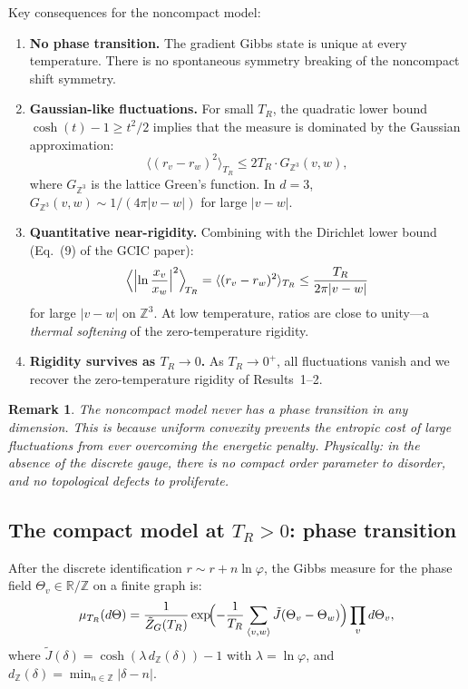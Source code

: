 \documentclass[11pt]{article}
\newtheorem{remark}{Remark}
\theoremstyle{definition}
\newcommand{\Jtilde}{\tilde{J}}
\newcommand{\TR}{{T_R}}
\newcommand{\phig}{\varphi}
\begin{document}
\noindent
Key consequences for the noncompact model:
\begin{enumerate}[nosep]
\item \textbf{No phase transition.} The gradient Gibbs state is unique at every temperature. There is no spontaneous symmetry breaking of the noncompact shift symmetry.
\item \textbf{Gaussian-like fluctuations.} For small $\TR$, the quadratic lower bound $\cosh(t) - 1 \geq t^2/2$ implies that the measure is dominated by the Gaussian approximation:
\begin{equation}
\langle (r_v - r_w)^2 \rangle_{\TR} \leq 2\TR \cdot G_{\mathbb{Z}^3}(v,w),
\end{equation}
where $G_{\mathbb{Z}^3}$ is the lattice Green's function. In $d = 3$, $G_{\mathbb{Z}^3}(v,w) \sim 1/(4\pi|v-w|)$ for large $|v-w|$.
\item \textbf{Quantitative near-rigidity.} Combining with the Dirichlet lower bound (Eq.~(9) of the GCIC paper):
\begin{equation}
\Bigl\langle\Bigl|\ln\frac{x_v}{x_w}\Bigr|^2\Bigr\rangle_{\!\TR} = \langle (r_v - r_w)^2\rangle_{\TR} \leq \frac{\TR}{2\pi|v - w|}
\end{equation}
for large $|v-w|$ on $\mathbb{Z}^3$. At low temperature, ratios are close to unity---a \emph{thermal softening} of the zero-temperature rigidity.
\item \textbf{Rigidity survives as $\TR \to 0$.} As $\TR \to 0^+$, all fluctuations vanish and we recover the zero-temperature rigidity of Results~1--2.
\end{enumerate}

\begin{remark}
The noncompact model \emph{never} has a phase transition in any dimension. This is because uniform convexity prevents the entropic cost of large fluctuations from ever overcoming the energetic penalty. Physically: in the absence of the discrete gauge, there is no compact order parameter to disorder, and no topological defects to proliferate.
\end{remark}

\subsection{The compact model at $\TR > 0$: phase transition}

After the discrete identification $r \sim r + n\ln\phig$, the Gibbs measure for the phase field $\Theta_v \in \mathbb{R}/\mathbb{Z}$ on a finite graph is:
\begin{equation}
\mu_{\TR}(d\Theta) = \frac{1}{\tilde{Z}_G(\TR)} \exp\!\Bigl(-\frac{1}{\TR}\sum_{\langle v,w\rangle} \Jtilde(\Theta_v - \Theta_w)\Bigr) \prod_v d\Theta_v,
\label{eq:gibbs-compact}
\end{equation}
where $\Jtilde(\delta) = \cosh(\lambda\, d_{\mathbb{Z}}(\delta)) - 1$ with $\lambda = \ln\phig$, and $d_{\mathbb{Z}}(\delta) = \min_{n \in \mathbb{Z}} |\delta - n|$.
\end{document}
